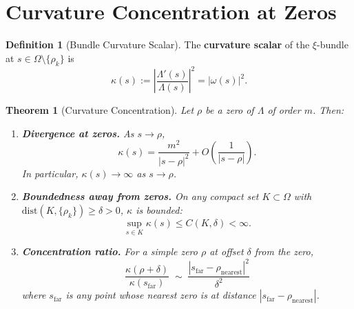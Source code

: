 \documentclass[11pt, a4paper]{article}
\theoremstyle{definition}
\newtheorem{definition}{Definition}[section]
\theoremstyle{plain}
\newtheorem{theorem}{Theorem}[section]
\newcommand{\xif}{\xi}                      %
\begin{document}
\section{Curvature Concentration at Zeros}
\label{sec:curvature_thm}

\begin{definition}[Bundle Curvature Scalar]
\label{def:curvature_scalar}
The \textbf{curvature scalar} of the $\xif$-bundle at $s \in
\Omega\setminus\{\rho_k\}$ is
\begin{equation}
  \kappa(s) := \left|\frac{\Lambda'(s)}{\Lambda(s)}\right|^2 = |\omega(s)|^2.
  \label{eq:kappa_def}
\end{equation}
\end{definition}

\begin{theorem}[Curvature Concentration]
\label{thm:curvature}
Let $\rho$ be a zero of $\Lambda$ of order $m$. Then:
\begin{enumerate}
  \item[\textup{(i)}] \textbf{Divergence at zeros.} As $s \to \rho$,
    \begin{equation}
      \kappa(s) = \frac{m^2}{|s - \rho|^2} + O\!\left(\frac{1}{|s-\rho|}\right).
      \label{eq:kappa_diverge}
    \end{equation}
    In particular, $\kappa(s) \to \infty$ as $s \to \rho$.

  \item[\textup{(ii)}] \textbf{Boundedness away from zeros.}
    On any compact set $K \subset \Omega$ with
    $\mathrm{dist}(K, \{\rho_k\}) \geq \delta > 0$,
    $\kappa$ is bounded:
    \begin{equation}
      \sup_{s \in K} \kappa(s) \leq C(K, \delta) < \infty.
      \label{eq:kappa_bounded}
    \end{equation}

  \item[\textup{(iii)}] \textbf{Concentration ratio.} For a simple zero
    $\rho$ at offset $\delta$ from the zero,
    \begin{equation}
      \frac{\kappa(\rho + \delta)}{\kappa(s_{\mathrm{far}})}
      \;\sim\; \frac{|s_{\mathrm{far}} - \rho_{\mathrm{nearest}}|^2}{\delta^2}
      \label{eq:concentration_ratio}
    \end{equation}
    where $s_{\mathrm{far}}$ is any point whose nearest zero is at
    distance $|s_{\mathrm{far}} - \rho_{\mathrm{nearest}}|$.
\end{enumerate}
\end{theorem}
\end{document}

